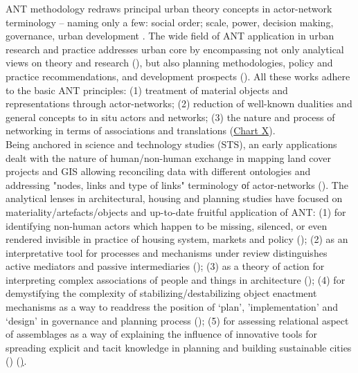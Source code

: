 \documentclass[11pt]{report}
\begin{document}
ANT methodology redraws principal urban theory concepts in actor-network terminology – naming only a few: social order; scale, power, decision making, governance, urban development . The wide field of ANT application in urban research and practice addresses urban core by encompassing not only analytical views on theory and research (\href{Boelens}{\citealt{boelens_theorizing_2010}}), but also planning methodologies, policy and practice recommendations, and development prospects (\href{Healey}{\citealt{healey_circuits_2013}}). All these works adhere to the basic ANT principles: (1) treatment of material objects and representations through actor-networks; (2) reduction of well-known dualities and general concepts to in situ actors and networks; (3) the nature and process of networking in terms of associations and translations (\href{Table ANT table}{Chart X}).
\\

Being anchored in science and technology studies (STS), an early applications dealt with the nature of human/non-human exchange in mapping land cover projects and GIS allowing reconciling data with different ontologies and addressing "nodes, links and type of links" terminology оf actor-networks (\href{Comber}{\citealt{comber_actornetwork_2003}}). The analytical lenses in architectural, housing and planning studies have focused on materiality/artefacts/objects and up-to-date fruitful application of ANT: (1) for identifying non-human actors which happen to be missing, silenced, or even rendered invisible in practice of housing system, markets and policy (\href{Gabriel}{\citealt{gabriel_post-social_2008}}); (2) as an interpretative tool for processes and mechanisms under review distinguishes active mediators and passive intermediaries (\href{Cowan}{\citealt{cowan_nominations:_2009}}); (3) as a theory of action for interpreting complex associations of people and things in architecture (\href{Fallan}{\citealt{fallan_architecture_2011}}); (4) for demystifying the complexity of stabilizing/destabilizing object enactment mechanisms as a way to readdress the position of ‘plan’, ’implementation’ and ‘design’ in governance and planning process (\href{Van_Assche}{\citealt{van_assche_co-evolutions_2013}}); (5) for assessing relational aspect of assemblages as a way of explaining the influence of innovative tools for spreading explicit and tacit knowledge in planning and building sustainable cities (\href{Georg}{\citealt{georg_building_2015}}) (\href{Table 1}).
\\
\end{document}
